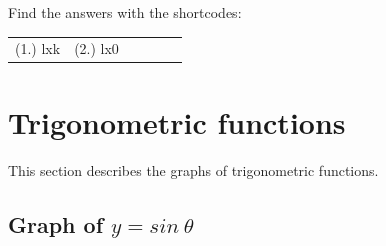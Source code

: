 \par {} Find the answers with the shortcodes:
\par \begin{tabular}[h]{cccccc}
(1.) lxk  &  (2.) lx0  & \end{tabular}

\section{Trigonometric functions}
\nopagebreak
This section describes the graphs of trigonometric functions.\par 

\subsection{Graph of $y=sin~\theta $}

